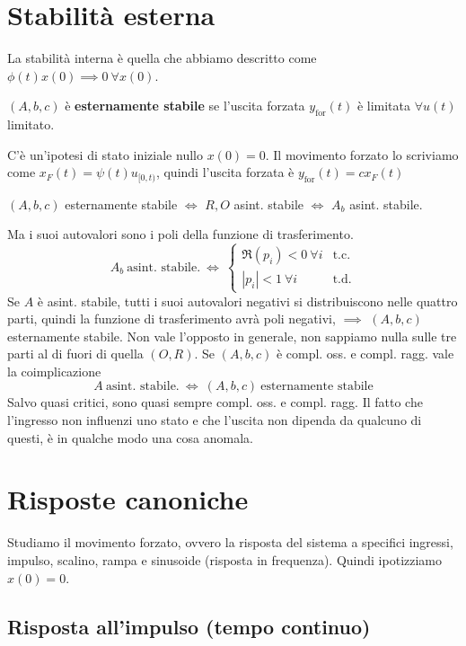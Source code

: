 \chapter{Stabilità esterna}

La stabilità interna è quella che abbiamo descritto come $\phi (t) x(0)\implies 0\ \forall x(0)$.
\begin{defn}
	$(A,b,c)$ è \textbf{esternamente stabile} se l'uscita forzata $y_{\text{for}}(t)$ è limitata $\forall u(t)$ limitato.
\end{defn}
C'è un'ipotesi di stato iniziale nullo $x(0) =0$. Il movimento forzato lo scriviamo come $x_F(t) =\psi (t) u_{[ 0,t)}$, quindi l'uscita forzata è $y_{\text{for}}(t) =cx_F(t)$
\begin{thm}
	$(A,b,c)$ esternamente stabile $\iff $ $R,O$ asint. stabile $\iff $ $A_b$ asint. stabile.
\end{thm}
Ma i suoi autovalori sono i poli della funzione di trasferimento.
\begin{equation*}
	A_b \ \text{asint. stabile.} \ \iff \ \begin{cases}
	\Re(p_i) < 0\ \forall i & \text{t.c.}\\
	| p_i| < 1\ \forall i & \text{t.d.}
	\end{cases}
\end{equation*}
Se $A$ è asint. stabile, tutti i suoi autovalori negativi si distribuiscono nelle quattro parti, quindi la funzione di trasferimento avrà poli negativi, $\implies $ $(A,b,c)$ esternamente stabile. Non vale l'opposto in generale, non sappiamo nulla sulle tre parti al di fuori di quella $(O,R)$. Se $(A,b,c)$ è compl. oss. e compl. ragg. vale la coimplicazione
\begin{equation*}
	A\ \text{asint. stabile.} \ \iff \ (A,b,c) \ \text{esternamente stabile}
\end{equation*}
Salvo quasi critici, sono quasi sempre compl. oss. e compl. ragg. Il fatto che l'ingresso non influenzi uno stato e che l'uscita non dipenda da qualcuno di questi, è in qualche modo una cosa anomala.

\chapter{Risposte canoniche}

Studiamo il movimento forzato, ovvero la risposta del sistema a specifici ingressi, impulso, scalino, rampa e sinusoide (risposta in frequenza). Quindi ipotizziamo $x(0) =0$.

\section{Risposta all'impulso (tempo continuo)}

